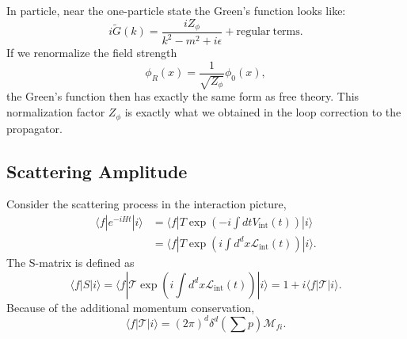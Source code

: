 In particle, near the one-particle state the Green's function looks like:
\begin{equation*}
	i\tilde G(k) = \frac{iZ_{\phi}}{k^2-m^2+i\epsilon} + \mathrm{regular\ terms}.
\end{equation*}
If we renormalize the field strength 
\begin{equation*}
	\phi_R(x) = \frac{1}{\sqrt{Z_\phi}}\phi_0(x),
\end{equation*}
the Green's function then has exactly the same form as free theory.
This normalization factor $Z_\phi$ is exactly what we obtained in the loop correction to the propagator.



\subsection{Scattering Amplitude}

Consider the scattering process in the interaction picture,
\begin{equation}
\begin{aligned}
	\langle f| e^{-iHt} |i\rangle &= \langle f| T \exp \left(-i\int dt V_{\mathrm{int}}(t) \right)|i\rangle \\
	&= \langle f| T \exp \left(i\int d^d x \mathcal{L}_{\mathrm{int}}(t) \right)|i\rangle.
\end{aligned}
\end{equation}
The S-matrix is defined as
\begin{equation}
	\langle f|S|i\rangle 
	= \langle f|\mathcal{T} \exp \left(i\int d^d x \mathcal{L}_{\mathrm{int}}(t) \right)|i\rangle 
	= 1 + i \langle f|\mathcal{T}|i\rangle .
\end{equation}
Because of the additional momentum conservation,
\begin{equation}
	\langle f|\mathcal{T}|i\rangle = (2\pi)^d \delta^d\left(\sum p\right) \mathcal M_{fi}.
\end{equation}


